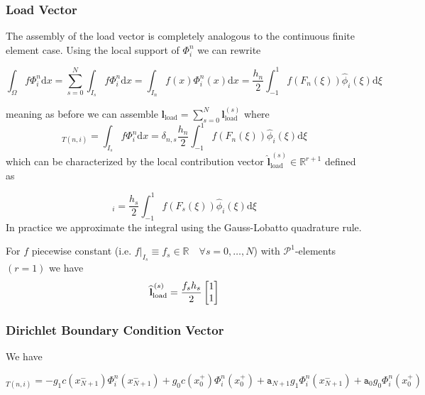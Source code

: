 \subsubsection{Load Vector}
The assembly of the load vector is completely analogous to the continuous finite element case.
Using the local support of $\Phi_i^n$ we can rewrite

\begin{equation*}
	\int_{\Omega} f \Phi_i^n \text{d}x = \sum_{s=0}^{N} \int_{I_s} f \Phi_i^n \text{d} x = \int_{I_n} f(x) \Phi_i^n(x) \text{d} x
	= \frac{h_n}{2} \int_{-1}^{1} f(F_n(\xi))\widehat{\phi}_i(\xi)\text{d}\xi
\end{equation*}

meaning as before we can assemble $\textbf{l}_{\text{load}} = \sum_{s=0}^{N} \textbf{l}_{\text{load}}^{(s)}$ where
\begin{equation*}
    [\textbf{l}_{\text{load}}^{(s)}]_{T(n,i)} = \int_{I_s} f \Phi_i^n \text{d} x = \delta_{n,s} \frac{h_n}{2} \int_{-1}^{1} f(F_n(\xi))\widehat{\phi}_i(\xi)\text{d}\xi
\end{equation*}
which can be characterized by the local contribution vector $\widehat{\textbf{l}}_{\text{load}}^{\,(s)} \in \mathbb{R}^{r+1}$ defined as

\begin{equation*}
	[\widehat{\textbf{l}}_{\text{load}}^{\,(s)}]_{i}
	= \frac{h_s}{2} \int_{-1}^{1} f(F_s(\xi))\widehat{\phi}_i(\xi)\text{d}\xi
\end{equation*}
In practice we approximate the integral using the Gauss-Lobatto quadrature rule.

\begin{example}
	For $f$ piecewise constant (i.e. $f|_{I_s} \equiv f_s \in \mathbb{R} \quad \forall s=0,\ldots,N$) with $\mathcal{P}^1$-elements $(r=1)$ we have
	\begin{equation*}
		\normalfont \widehat{\textbf{l}}_{\text{load}}^{\,(s)} = \frac{f_s h_s}{2}
		\begin{bmatrix}
			1 \\
			1
		\end{bmatrix}
	\end{equation*}
\end{example}

\subsubsection{Dirichlet Boundary Condition Vector}
We have

\begin{equation*}
	[\textbf{l}_{\text{bc}}]_{T(n,i)} =
	-g_1c(x_{N+1}^-)\Phi_i^n(x_{N+1}^-) + g_0c(x_0^+)\Phi_i^n(x_0^+)
	+ \texttt{a}_{N+1}g_1\Phi_i^n(x_{N+1}^-) + \texttt{a}_0 g_0\Phi_i^n(x_{0}^+)
\end{equation*}


